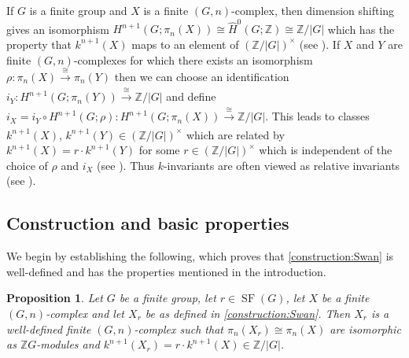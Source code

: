 \documentclass[11pt,leqno,a4paper]{amsart}
\newcommand{\Z}{\mathbb{Z}}
\DeclareMathOperator{\SF}{SF}
\newtheorem{prop}[thm]{Proposition}
\theoremstyle{definition}
\theoremstyle{remark}
\theoremstyle{custom}
\newcommand{\wh}{\widehat}
\begin{document}
If $G$ is a finite group and $X$ is a finite $(G,n)$-complex, then dimension shifting gives an isomorphism $H^{n+1}(G;\pi_n(X)) \cong \wh H^0(G;\Z) \cong \Z/|G|$ which has the property that $k^{n+1}(X)$ maps to an element of $(\Z/|G|)^\times$ (see \cite[Section 2]{Dy76}). 
If $X$ and $Y$ are finite $(G,n)$-complexes for which there exists an isomorphism $\rho : \pi_n(X) \xrightarrow[]{\cong} \pi_n(Y)$ then we can choose an identification $i_Y : H^{n+1}(G;\pi_n(Y)) \xrightarrow[]{\cong} \Z/|G|$ and define $i_X = i_Y \circ H^{n+1}(G;\rho) : H^{n+1}(G;\pi_n(X)) \xrightarrow[]{\cong} \Z/|G|$.
This leads to classes $k^{n+1}(X)$, $k^{n+1}(Y) \in (\Z/|G|)^\times$ which are related by $k^{n+1}(X) = r \cdot k^{n+1}(Y)$ for some $r \in (\Z/|G|)^\times$ which is independent of the choice of $\rho$ and $i_X$ (see \cite[Section 2]{Dy76}). Thus $k$-invariants are often viewed as relative invariants (see \cite[Section 34]{Jo03a}).

\subsection{Construction and basic properties} \label{ss:CW-construction}

We begin by establishing the following, which proves that \cref{construction:Swan} is well-defined and has the properties mentioned in the introduction.

\begin{prop} \label{prop:construction-info}
Let $G$ be a finite group, let $r \in \SF(G)$, let $X$ be a finite $(G,n)$-complex and let $X_r$ be as defined in \cref{construction:Swan}. Then $X_r$ is a well-defined finite $(G,n)$-complex such that $\pi_n(X_r) \cong \pi_n(X)$ are isomorphic as $\Z G$-modules and $k^{n+1}(X_r) = r \cdot k^{n+1}(X) \in \Z/|G|$.
\end{prop}
\end{document}
